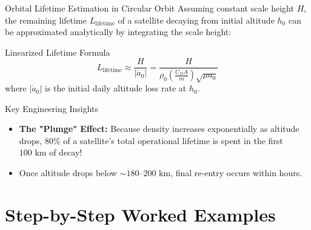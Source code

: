 \documentclass[aspectratio=169,11pt]{beamer}
\begin{document}
\begin{frame}{Orbital Lifetime Estimation in Circular Orbit}
    Assuming constant scale height $H$, the remaining lifetime $L_{\text{lifetime}}$ of a satellite decaying from initial altitude $h_0$ can be approximated analytically by integrating the scale height:

    \begin{block}{Linearized Lifetime Formula}
        \begin{equation*}
            L_{\text{lifetime}} \approx \frac{H}{|\dot{a}_0|} = \frac{H}{\rho_0 \left(\frac{C_D A}{m}\right) \sqrt{\mu a_0}}
        \end{equation*}
        where $|\dot{a}_0|$ is the initial daily altitude loss rate at $h_0$.
    \end{block}

    \medskip

    \begin{exampleblock}{Key Engineering Insights}
        \begin{itemize}
            \item \textbf{The "Plunge" Effect:} Because density increases exponentially as altitude drops, $80\%$ of a satellite's total operational lifetime is spent in the first $100\text{ km}$ of decay!
            \item Once altitude drops below $\sim 180\text{--}200\text{ km}$, final re-entry occurs within hours.
        \end{itemize}
    \end{exampleblock}
\end{frame}

\section{Step-by-Step Worked Examples}
\end{document}
